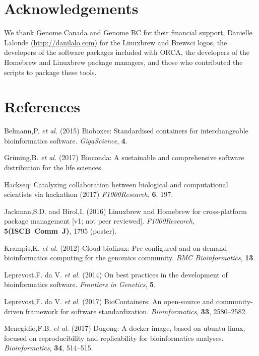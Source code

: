 \documentclass{bioinfo}
\begin{document}
\section*{Acknowledgements}

We thank Genome Canada and Genome BC for their financial support, Danielle Lalonde (\url{http://danilalo.com}) for the Linuxbrew and Brewsci logos, the developers of the software packages included with ORCA, the developers of the Homebrew and Linuxbrew package managers, and those who contributed the scripts to package these tools.

\section*{References}

\begin{list}{}{
\setlength{\leftmargin}{4mm}
\setlength{\itemindent}{-4mm}
}
\small
\item Belmann,P. \emph{et al.} (2015) Bioboxes: Standardised containers for interchangeable bioinformatics software. \emph{GigaScience}, \textbf{4}.
\item Gr\"uning,B. \emph{et al.} (2017) Bioconda: A sustainable and comprehensive software distribution for the life sciences.
\item Hackseq: Catalyzing collaboration between biological and computational scientists via hackathon (2017) \emph{F1000Research}, \textbf{6}, 197.
\item Jackman,S.D. and Birol,I. (2016) Linuxbrew and Homebrew for cross-platform package management {[}v1; not peer reviewed{]}. \emph{F1000Research}, \textbf{5(ISCB~Comm~J)}, 1795 (poster).
\item Krampis,K. \emph{et al.} (2012) Cloud biolinux: Pre-configured and on-demand bioinformatics computing for the genomics community. \emph{BMC Bioinformatics}, \textbf{13}.
\item Leprevost,F. da V. \emph{et al.} (2014) On best practices in the development of bioinformatics software. \emph{Frontiers in Genetics}, \textbf{5}.
\item Leprevost,F. da V. \emph{et al.} (2017) BioContainers: An open-source and community-driven framework for software standardization. \emph{Bioinformatics}, \textbf{33}, 2580--2582.
\item Menegidio,F.B. \emph{et al.} (2017) Dugong: A docker image, based on ubuntu linux, focused on reproducibility and replicability for bioinformatics analyses. \emph{Bioinformatics}, \textbf{34}, 514--515.
\item
\end{list}
\end{document}
